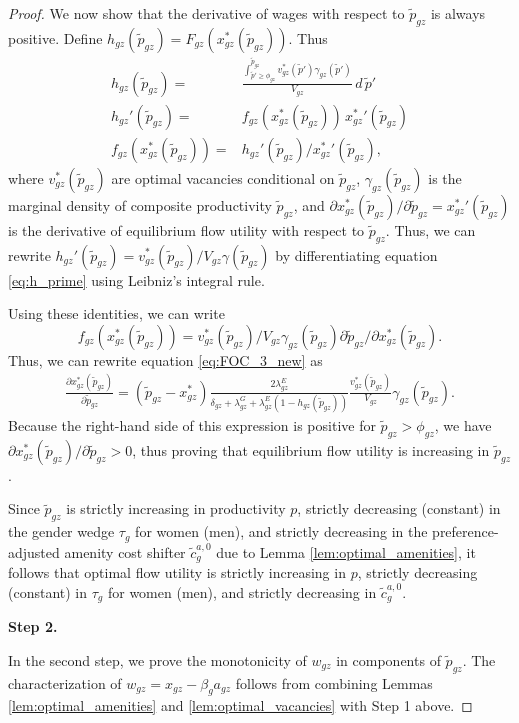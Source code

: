 \begin{proof}
    We now show that the derivative of wages with respect to $\tilde{p}_{gz}$ is always positive.
    Define $h_{gz}(\tilde{p}_{gz}) = F_{gz}(x_{gz}^{*}(\tilde{p}_{gz}))$. Thus
    \begin{align}
        h_{gz}(\tilde{p}_{gz}) = & \frac{\displaystyle\int_{\tilde{p}' \geq \phi_{gz}}^{\tilde{p}_{gz}} {v}_{gz}^{*}(\tilde{p}') \gamma_{gz}(\tilde{p}')}{V_{gz}} \, d \, \tilde{p}' \\
        h_{gz}'(\tilde{p}_{gz}) = & f_{gz}(x_{gz}^{*}(\tilde{p}_{gz})) \, {x_{gz}^{*}}'(\tilde{p}_{gz}) \\
        f_{gz}(x_{gz}^{*}(\tilde{p}_{gz})) = & h_{gz}'(\tilde{p}_{gz})/{x_{gz}^{*}}'(\tilde{p}_{gz}), \label{eq:h_prime}
    \end{align}
    where ${v}_{gz}^{*}(\tilde{p}_{gz})$ are optimal vacancies conditional on $\tilde{p}_{gz}$, $\gamma_{gz}(\tilde{p}_{gz})$ is the marginal density of composite productivity $\tilde{p}_{gz}$, and $\partial x_{gz}^{*}(\tilde{p}_{gz})/\partial \tilde{p}_{gz} = {x_{gz}^{*}}'(\tilde{p}_{gz})$ is the derivative of equilibrium flow utility with respect to $\tilde{p}_{gz}$. Thus, we can rewrite $h_{gz}'(\tilde{p}_{gz}) = {v}_{gz}^{*}(\tilde{p}_{gz}) / V_{gz} \gamma(\tilde{p}_{gz})$ by differentiating equation \eqref{eq:h_prime} using Leibniz's integral rule.

    Using these identities, we can write $$f_{gz}(x_{gz}^{*}(\tilde{p}_{gz})) = {v}_{gz}^{*}(\tilde{p}_{gz}) / V_{gz} \gamma_{gz}(\tilde{p}_{gz}) \partial \tilde{p}_{gz} / \partial x_{gz}^{*}(\tilde{p}_{gz}).$$ Thus, we can rewrite equation \eqref{eq:FOC_3_new} as
    \begin{align}
        \frac{\partial x_{gz}^{*}(\tilde{p}_{gz})}{\partial \tilde{p}_{gz}} = (\tilde{p}_{gz} - x_{gz}^{*}) \frac{2 \lambda_{gz}^{E}}{\delta_{gz} + \lambda_{gz}^{G} + \lambda_{gz}^{E} (1 - h_{gz}(\tilde{p}_{gz}))} \frac{{v}_{gz}^{*}(\tilde{p}_{gz})}{V_{gz}} \gamma_{gz}(\tilde{p}_{gz}). \label{eq:FOC_utility}
    \end{align}
    Because the right-hand side of this expression is positive for $\tilde{p}_{gz} > \phi_{gz}$, we have $\partial x_{gz}^{*}(\tilde{p}_{gz})/\partial \tilde{p}_{gz} > 0$, thus proving that equilibrium flow utility is increasing in $\tilde{p}_{gz}$.

    Since $\tilde{p}_{gz}$ is strictly increasing in productivity $p$, strictly decreasing (constant) in the gender wedge $\tau_{g}$ for women (men), and strictly decreasing in the preference-adjusted amenity cost shifter $\tilde{c}_{g}^{a,0}$ due to Lemma \ref{lem:optimal_amenities}, it follows that optimal flow utility is strictly increasing in $p$, strictly decreasing (constant) in $\tau_{g}$ for women (men), and strictly decreasing in $\tilde{c}_{g}^{a,0}$.


    \textbf{Step 2.}

    In the second step, we prove the monotonicity of $w_{gz}$ in components of $\tilde{p}_{gz}$. The characterization of $w_{gz} = x_{gz} - \beta_{g} a_{gz}$ follows from combining Lemmas \ref{lem:optimal_amenities} and \ref{lem:optimal_vacancies} with Step 1 above.
\end{proof}


